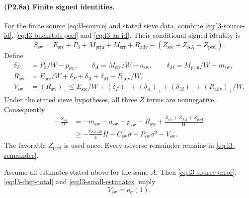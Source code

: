 \paragraph{(P2.8a) Finite signed identities.}
For the finite source \eqref{eq:l3-source} and stated sieve data,
combine \eqref{eq:l3-source-id}, \eqref{eq:l3-buchstab-peel}
and \eqref{eq:l3-aa-id}.
Their conditional signed identity is
\begin{equation}\label{eq:l3-rsw-id}
 S_{\mathrm{sw}}=E_{\mathrm{src}}+P_3+M_{\mathrm{prin}}
   +M_{\mathrm{err}}+R_{\mathrm{adv}}
                   -(Z_{\mathrm{src}}+Z_{\mathrm{AA}}+Z_{\mathrm{peel}}).
\end{equation}
Define
\begin{equation}\label{eq:l3-remainder}
\begin{aligned}
 \delta_P&=P_3/W-p_{\mathrm{sw}},\qquad
 \delta_A=M_{\mathrm{err}}/W-a_{\mathrm{sw}},\qquad
 \delta_M=M_{\mathrm{prin}}/W-m_{\mathrm{sw}},\\
 R_{\mathrm{sw}}&=E_{\mathrm{src}}/W+\delta_P+\delta_A+\delta_M
                                                +R_{\mathrm{adv}}/W,\\
 V_{\mathrm{sw}}&=(R_{\mathrm{sw}})_+\le E_{\mathrm{src}}/W
     +(\delta_P)_++(\delta_A)_++(\delta_M)_++(R_{\mathrm{adv}})_+/W.
\end{aligned}
\end{equation}
Under the stated sieve hypotheses, all three $Z$ terms are nonnegative.
Consequently
\begin{equation}\label{eq:l3-final}
\begin{aligned}
 -\frac{S_{\mathrm{sw}}}{W}
 &=-m_{\mathrm{sw}}-a_{\mathrm{sw}}-p_{\mathrm{sw}}-R_{\mathrm{sw}}
       +\frac{Z_{\mathrm{src}}+Z_{\mathrm{AA}}+Z_{\mathrm{peel}}}{W}\\
 &\ge-\frac{c_{K2,G0}}4\overline H
          -C_{\mathrm{sw}}\sigma-P_{\mathrm{sw}}\sigma^9-V_{\mathrm{sw}}.
\end{aligned}
\end{equation}
The favorable $Z_{\mathrm{peel}}$ is used once.
Every adverse remainder remains in \eqref{eq:l3-remainder}.

Assume all estimates stated above for the same $A$.
Then \eqref{eq:l3-source-error}, \eqref{eq:l3-disp-total}
and \eqref{eq:l3-small-estimates} imply
\begin{equation}\label{eq:l3-remainder-limit}
 V_{\mathrm{sw}}=o_\sigma(1).
\end{equation}
